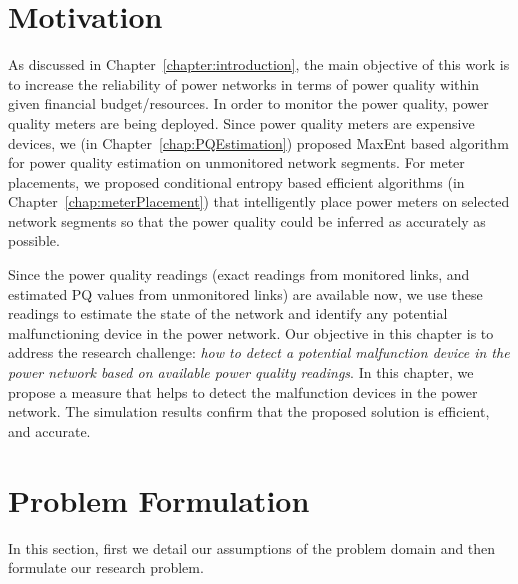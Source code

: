 \newcommand{\defeq}{\buildrel {\text{ def }}\over =}
\newcommand{\leftrightarrowtriangleqrel}{\mathrel{\overset\triangleq\leftrightarrow}}

\label{chap:predictionModel}
\section{Motivation}
As discussed in Chapter~\ref{chapter:introduction}, the main objective of this work is to increase the reliability of power networks in terms of power quality within given financial budget/resources. In order to monitor the power quality, power quality meters are being deployed. Since power quality meters are expensive devices, we (in Chapter~\ref{chap:PQEstimation}) proposed MaxEnt based algorithm for power quality estimation on unmonitored network segments. For meter placements, we proposed conditional entropy based efficient algorithms (in Chapter~\ref{chap:meterPlacement}) that intelligently place power meters on selected network segments so that the power quality could be inferred as accurately as possible.

Since the power quality readings (exact readings from monitored links, and estimated PQ values from unmonitored links) are available now, we use these readings to estimate the state of the network and identify any potential malfunctioning device in the power network. Our objective in this chapter is to address the research challenge: \textit{how to detect a potential malfunction device in the power network based on available power quality readings}. In this chapter, we propose a measure that helps to detect the malfunction devices in the power network. The simulation results confirm that the proposed solution is efficient, and accurate.

\section{Problem Formulation}
In this section, first we detail our assumptions of the problem domain and then formulate our research problem.


